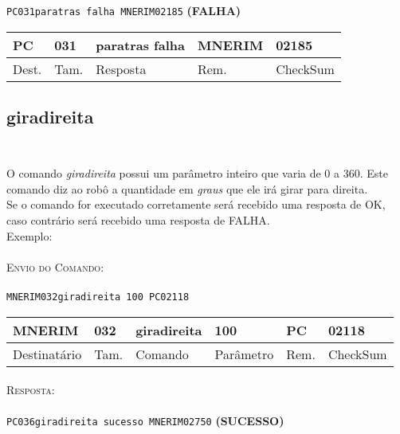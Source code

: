 \documentclass[11pt,	 papera4]{article}
\begin{document}
\hspace*{1.2cm} \texttt{PC031paratras falha MNERIM02185} \hspace*{2.5cm}\textbf{(FALHA)}

\begin{table}[h]
	\centering
	\begin{tabular}{p{1cm}p{1cm}p{3cm}p{2cm}p{2cm}}
		\toprule
		PC & 031 &paratras falha  & MNERIM & 02185 \\
		\midrule	
		Dest. & Tam. & Resposta & Rem. & CheckSum \\
		\bottomrule
	\end{tabular}
	\label{tab:formatoslatex} %
\end{table}

\newpage 

\subsection*{giradireita \\\\}
O comando \textit{giradireita} possui um parâmetro inteiro que varia de 0 a 360.  
Este comando diz ao robô a quantidade em \textit{graus} que ele irá girar para direita.\\
Se o comando for executado corretamente será recebido uma resposta de OK, caso contrário será recebido uma resposta de FALHA. \\
\newline
Exemplo: \\\\ \hspace*{0.5cm} 
\textsc{Envio do Comando:} \\\\ \hspace*{2cm} \texttt{MNERIM032giradireita 100 PC02118} \\

\begin{table}[h]
	\centering
	\begin{tabular}{p{2cm}p{1cm}p{2cm}p{2cm}p{1cm}p{2cm}}
		\toprule
		MNERIM & 032 & giradireita & 100 & PC & 02118 \\
		\midrule	
		Destinatário & Tam. & Comando & Parâmetro &Rem. & CheckSum \\
		\bottomrule
	\end{tabular}
	\label{tab:formatoslatex} %
\end{table}

\paragraph*{\newline\newline}
\hspace*{0.8cm}\textsc{Resposta:} \\\\ \hspace*{2cm}\texttt{PC036giradireita sucesso MNERIM02750} \hspace*{2cm}\textbf{(SUCESSO)}
\end{document}
